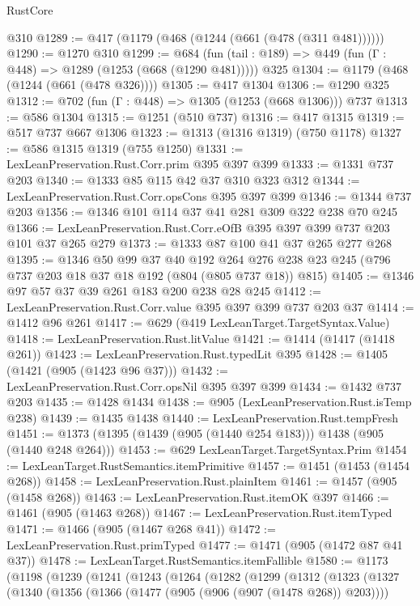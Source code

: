 \begin{lexlean}{RustCore}
\begin{coremodule}
    @310
@1289 := @417 (@1179 (@468 (@1244 (@661 (@478 (@311 @481))))))
@1290 := @1270 @310
@1299 := @684 (fun (tail : @189) => @449 (fun (Γ : @448) => @1289 (@1253 (@668 (@1290 @481))))) @325
@1304 := @1179 (@468 (@1244 (@661 (@478 @326))))
@1305 := @417 @1304
@1306 := @1290 @325
@1312 := @702 (fun (Γ : @448) => @1305 (@1253 (@668 @1306))) @737
@1313 := @586 @1304
@1315 := @1251 (@510 @737)
@1316 := @417 @1315
@1319 := @517 @737 @667 @1306
@1323 := @1313 (@1316 @1319) (@750 @1178)
@1327 := @586 @1315 @1319 (@755 @1250)
@1331 := LexLeanPreservation.Rust.Corr.prim @395 @397 @399
@1333 := @1331 @737 @203
@1340 := @1333 @85 @115 @42 @37 @310 @323 @312
@1344 := LexLeanPreservation.Rust.Corr.opsCons @395 @397 @399
@1346 := @1344 @737 @203
@1356 := @1346 @101 @114 @37 @41 @281 @309 @322 @238 @70 @245
@1366 := LexLeanPreservation.Rust.Corr.eOfB @395 @397 @399 @737 @203 @101 @37 @265 @279
@1373 := @1333 @87 @100 @41 @37 @265 @277 @268
@1395 := @1346
    @50
    @99
    @37
    @40
    @192
    @264
    @276
    @238
    @23
    @245
    (@796 @737 @203 @18 @37 @18 @192 (@804 (@805 @737 @18)) @815)
@1405 := @1346 @97 @57 @37 @39 @261 @183 @200 @238 @28 @245
@1412 := LexLeanPreservation.Rust.Corr.value @395 @397 @399 @737 @203 @37
@1414 := @1412 @96 @261
@1417 := @629 (@419 LexLeanTarget.TargetSyntax.Value)
@1418 := LexLeanPreservation.Rust.litValue
@1421 := @1414 (@1417 (@1418 @261))
@1423 := LexLeanPreservation.Rust.typedLit @395
@1428 := @1405 (@1421 (@905 (@1423 @96 @37)))
@1432 := LexLeanPreservation.Rust.Corr.opsNil @395 @397 @399
@1434 := @1432 @737 @203
@1435 := @1428 @1434
@1438 := @905 (LexLeanPreservation.Rust.isTemp @238)
@1439 := @1435 @1438
@1440 := LexLeanPreservation.Rust.tempFresh
@1451 := @1373 (@1395 (@1439 (@905 (@1440 @254 @183))) @1438 (@905 (@1440 @248 @264)))
@1453 := @629 LexLeanTarget.TargetSyntax.Prim
@1454 := LexLeanTarget.RustSemantics.itemPrimitive
@1457 := @1451 (@1453 (@1454 @268))
@1458 := LexLeanPreservation.Rust.plainItem
@1461 := @1457 (@905 (@1458 @268))
@1463 := LexLeanPreservation.Rust.itemOK @397
@1466 := @1461 (@905 (@1463 @268))
@1467 := LexLeanPreservation.Rust.itemTyped
@1471 := @1466 (@905 (@1467 @268 @41))
@1472 := LexLeanPreservation.Rust.primTyped
@1477 := @1471 (@905 (@1472 @87 @41 @37))
@1478 := LexLeanTarget.RustSemantics.itemFallible
@1580 := @1173
    (@1198
      (@1239
        (@1241
          (@1243
            (@1264
              (@1282
                (@1299
                  (@1312
                    (@1323
                      (@1327
                        (@1340
                          (@1356
                            (@1366 (@1477 (@905 (@906 (@907 (@1478 @268)) @203))))

\end{coremodule}
\end{lexlean}
